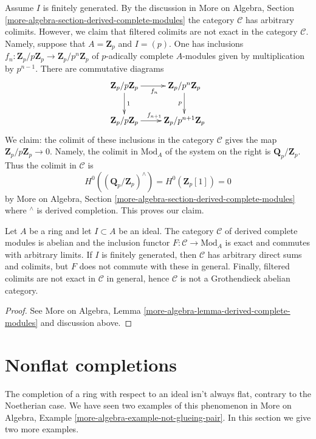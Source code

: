 \medskip\noindent
Assume $I$ is finitely generated. By the discussion in More on Algebra, Section
\ref{more-algebra-section-derived-complete-modules} the category
$\mathcal{C}$ has arbitrary colimits. However, we claim that filtered colimits
are not exact in the category $\mathcal{C}$. Namely, suppose that
$A = \mathbf{Z}_p$ and $I = (p)$. One has inclusions
$f_n : \mathbf{Z}_p/p\mathbf{Z}_p \to \mathbf{Z}_p/p^n\mathbf{Z}_p$
of $p$-adically complete $A$-modules given by multiplication by
$p^{n - 1}$. There are commutative diagrams
$$
\xymatrix{
\mathbf{Z}_p/p\mathbf{Z}_p \ar[r]_{f_n} \ar[d]^1 &
\mathbf{Z}_p/p^n\mathbf{Z}_p \ar[d]_p \\
\mathbf{Z}_p/p\mathbf{Z}_p \ar[r]^{f_{n + 1}} &
\mathbf{Z}_p/p^{n + 1}\mathbf{Z}_p
}
$$
We claim: the colimit of these inclusions in the category $\mathcal{C}$
gives the map $\mathbf{Z}_p/p\mathbf{Z}_p \to 0$. Namely, the colimit in
$\text{Mod}_A$ of the system on the right is $\mathbf{Q}_p/\mathbf{Z}_p$.
Thus the colimit in $\mathcal{C}$ is
$$
H^0((\mathbf{Q}_p/\mathbf{Z}_p)^\wedge) =
H^0(\mathbf{Z}_p[1]) = 0
$$
by More on Algebra, Section
\ref{more-algebra-section-derived-complete-modules}
where ${}^\wedge$ is derived completion.
This proves our claim.

\begin{lemma}
\label{lemma-derived-complete-modules}
Let $A$ be a ring and let $I \subset A$ be an ideal.
The category $\mathcal{C}$ of derived complete modules
is abelian and the inclusion functor $F : \mathcal{C} \to \text{Mod}_A$
is exact and commutes with arbitrary limits.
If $I$ is finitely generated, then $\mathcal{C}$ has
arbitrary direct sums and colimits, but $F$ does not commute with these
in general. Finally, filtered colimits are not exact in $\mathcal{C}$
in general, hence $\mathcal{C}$ is not a Grothendieck abelian category.
\end{lemma}

\begin{proof}
See More on Algebra, Lemma \ref{more-algebra-lemma-derived-complete-modules}
and discussion above.
\end{proof}





\section{Nonflat completions}
\label{section-nonflat}

\noindent
The completion of a ring with respect to an ideal isn't always flat,
contrary to the Noetherian case. We have seen two examples of this
phenomenon in
More on Algebra, Example \ref{more-algebra-example-not-glueing-pair}.
In this section we give two more examples.

